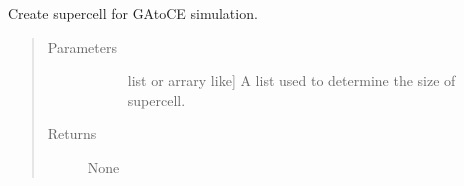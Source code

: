 \documentclass[letterpaper,10pt,english]{sphinxmanual}
\begin{document}
\begin{fulllineitems}
\label{\detokenize{pygace.scripts:pygace.scripts.rungace.build_supercell_template}}
\sphinxAtStartPar
Create supercell for GA\sphinxhyphen{}to\sphinxhyphen{}CE simulation.
\begin{quote}\begin{description}
\item[{Parameters}] \leavevmode\begin{description}
\item[{}] \leavevmode{[}list or arrary like{]}
\sphinxAtStartPar
A list used to determine the size of supercell.

\end{description}

\item[{Returns}] \leavevmode\begin{description}
\item[{None}] \leavevmode
\end{description}

\end{description}\end{quote}

\end{fulllineitems}

\end{document}
